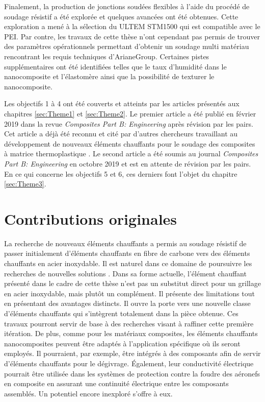 Finalement, la production de jonctions soudées flexibles à l'aide du procédé de soudage résistif a été explorée et quelques avancées ont été obtenues. 
Cette exploration a mené à la sélection du ULTEM STM1500 qui est compatible avec le PEI. 
Par contre, les travaux de cette thèse n'ont cependant pas permis de trouver des paramètres opérationnels permettant d'obtenir un soudage multi matériau rencontrant les requis techniques d'ArianeGroup. 
Certaines pistes supplémentaires ont été identifiées telles que le taux d'humidité dans le nanocomposite et l'élastomère ainsi que la possibilité de texturer le nanocomposite. 

Les objectifs 1 à 4 ont été couverts et atteints par les articles présentés aux chapitres \ref{sec:Theme1} et \ref{sec:Theme2}. 
Le premier article \cite{Brassard2019a} a été publié en février 2019 dans la revue \textit{Composites Part B: Engineering} après révision par les pairs. 
Cet article a déjà été reconnu et cité par d'autres chercheurs travaillant au développement de nouveaux éléments chauffants pour le soudage des composites à matrice thermoplastique \cite{Russello2019}. 
Le second article a été soumis au journal \textit{Composites Part B: Engineering} en octobre 2019 et est en attente de révision par les pairs. 
En ce qui concerne les objectifs 5 et 6, ces derniers font l'objet du chapitre \ref{sec:Theme3}. 

\section{Contributions originales}

La recherche de nouveaux éléments chauffants a permis au soudage résistif de passer initialement d'éléments chauffants en fibre de carbone vers des éléments chauffants en acier inoxydable. 
Il est naturel dans ce domaine de poursuivre les recherches de nouvelles solutions \cite{Russello2019}. 
Dans sa forme actuelle, l'élément chauffant présenté dans le cadre de cette thèse n'est pas un substitut direct pour un grillage en acier inoxydable, mais plutôt un complément. 
Il présente des limitations tout en présentant des avantages distincts.
Il ouvre la porte vers une nouvelle classe d'éléments chauffants qui s'intègrent totalement dans la pièce obtenue. 
Ces travaux pourront servir de base à des recherches visant à raffiner cette première itération. 
De plus, comme pour les matériaux composites, les éléments chauffants nanocomposites peuvent être adaptés à l'application spécifique où ils seront employés. 
Il pourraient, par exemple, être intégrés à des composants afin de servir d'éléments chauffants pour le dégivrage. 
Également, leur conductivité électrique pourrait être utilisée dans les systèmes de protection contre la foudre des aéronefs en composite en assurant une continuité électrique entre les composants assemblés. 
Un potentiel encore inexploré s'offre à eux. 

